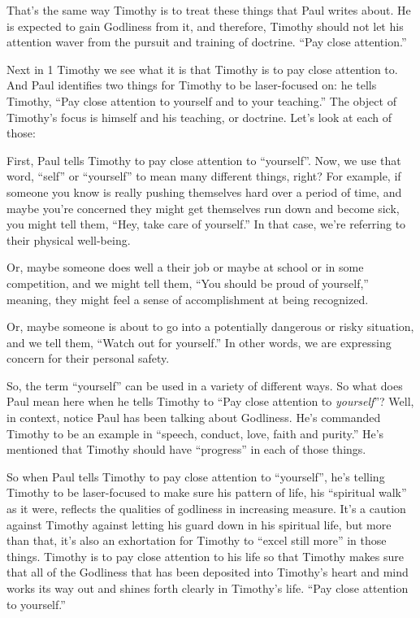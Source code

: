 \documentclass[letterpaper, 12pt]{article}
\begin{document}
    That's the same way Timothy is to treat these things that Paul
    writes about. He is expected to gain Godliness from it, and
    therefore, Timothy should not let his attention waver from the
    pursuit and training of doctrine. ``Pay close attention.''

    Next in 1 Timothy we see what it is that Timothy is to pay close
    attention to. And Paul identifies two things for Timothy to be
    laser-focused on: he tells Timothy, ``Pay close attention to
    yourself and to your teaching.'' The object of Timothy's focus is
    himself and his teaching, or doctrine. Let's look at each of those:

    First, Paul tells Timothy to pay close attention to ``yourself''.
    Now, we use that word, ``self'' or ``yourself'' to mean many
    different things, right? For example, if someone you know is really
    pushing themselves hard over a period of time, and maybe you're
    concerned they might get themselves run down and become sick, you
    might tell them, ``Hey, take care of yourself.'' In that case, we're
    referring to their physical well-being.

    Or, maybe someone does well a their job or maybe at school or in
    some competition, and we might tell them, ``You should be proud of
    yourself,'' meaning, they might feel a sense of accomplishment at
    being recognized.

    Or, maybe someone is about to go into a potentially dangerous or
    risky situation, and we tell them, ``Watch out for yourself.'' In
    other words, we are expressing concern for their personal safety.

    So, the term ``yourself'' can be used in a variety of different
    ways. So what does Paul mean here when he tells Timothy to ``Pay
    close attention to \emph{yourself}''? Well, in context, notice Paul
    has been talking about Godliness. He's commanded Timothy to be an
    example in ``speech, conduct, love, faith and purity.'' He's
    mentioned that Timothy should have ``progress'' in each of those
    things.

    So when Paul tells Timothy to pay close attention to ``yourself'',
    he's telling Timothy to be laser-focused to make sure his pattern of
    life, his ``spiritual walk'' as it were, reflects the qualities of
    godliness in increasing measure. It's a caution against Timothy
    against letting his guard down in his spiritual life, but more than
    that, it's also an exhortation for Timothy to ``excel still more''
    in those things. Timothy is to pay close attention to his life so
    that Timothy makes sure that all of the Godliness that has been
    deposited into Timothy's heart and mind works its way out and shines
    forth clearly in Timothy's life. ``Pay close attention to
    yourself.''
\end{document}

